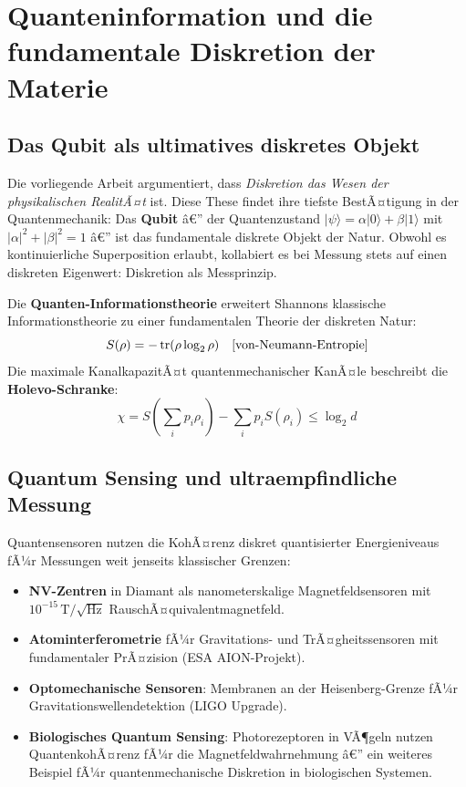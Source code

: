 ﻿\documentclass[12pt,a4paper,titlepage]{report}
\begin{document}
\section{Quanteninformation und die fundamentale Diskretion der Materie}

\subsection{Das Qubit als ultimatives diskretes Objekt}

Die vorliegende Arbeit argumentiert, dass \emph{Diskretion das Wesen der physikalischen
RealitÃ¤t} ist. Diese These findet ihre tiefste BestÃ¤tigung in der Quantenmechanik:
Das \textbf{Qubit} â€” der Quantenzustand $|\psi\rangle = \alpha|0\rangle + \beta|1\rangle$
mit $|\alpha|^2 + |\beta|^2 = 1$ â€” ist das fundamentale diskrete Objekt der Natur.
Obwohl es kontinuierliche Superposition erlaubt, kollabiert es bei Messung stets
auf einen diskreten Eigenwert: Diskretion als Messprinzip.

Die \textbf{Quanten-Informationstheorie} erweitert Shannons klassische Informationstheorie
zu einer fundamentalen Theorie der diskreten Natur:
\[
    S(\rho) = -\tr(\rho \log_2 \rho) \quad \text{[von-Neumann-Entropie]}
\]
Die maximale KanalkapazitÃ¤t quantenmechanischer KanÃ¤le beschreibt die
\textbf{Holevo-Schran\-ke}:
\[
    \chi = S\!\left(\sum_i p_i \rho_i\right) - \sum_i p_i S(\rho_i) \leq \log_2 d
\]

\subsection{Quantum Sensing und ultraempfindliche Messung}

Quantensensoren nutzen die KohÃ¤renz diskret quantisierter Energieniveaus fÃ¼r
Messungen weit jenseits klassischer Grenzen:
\begin{itemize}[leftmargin=2em]
    \item \textbf{NV-Zentren} in Diamant als nanometerskalige Magnetfeldsensoren
        mit $10^{-15}\,\mathrm{T}/\!\sqrt{\mathrm{Hz}}$ RauschÃ¤quivalentmagnetfeld.
    \item \textbf{Atominterferometrie} fÃ¼r Gravitations- und TrÃ¤gheitssensoren
        mit fundamentaler PrÃ¤zision (ESA AION-Projekt).
    \item \textbf{Optomechanische Sensoren}: Membranen an der Heisenberg-Grenze
        fÃ¼r Gravitationswellendetektion (LIGO Upgrade).
    \item \textbf{Biologisches Quantum Sensing}: Photorezeptoren in VÃ¶geln
        nutzen QuantenkohÃ¤renz fÃ¼r die Magnetfeldwahrnehmung â€” ein weiteres
        Beispiel fÃ¼r quantenmechanische Diskretion in biologischen Systemen.
\end{itemize}
\end{document}
